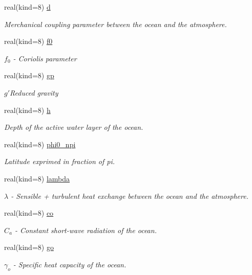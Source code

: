 \begin{DoxyCompactItemize}
real(kind=8) \hyperlink{classparams_a612e8c87d1d9514ebe7ab3ac95141be3}{d}
\begin{DoxyCompactList}\small\item\em Merchanical coupling parameter between the ocean and the atmosphere. \end{DoxyCompactList}\item 
real(kind=8) \hyperlink{classparams_a83c176b3a593aa6ac77c50d2b5b21032}{f0}
\begin{DoxyCompactList}\small\item\em $f_0$ -\/ Coriolis parameter \end{DoxyCompactList}\item 
real(kind=8) \hyperlink{classparams_a29ba9893360b5685ca584deead6dbc55}{gp}
\begin{DoxyCompactList}\small\item\em $g'$Reduced gravity \end{DoxyCompactList}\item 
real(kind=8) \hyperlink{classparams_a6d9c99d7dfc62518cf51eb98e7f39707}{h}
\begin{DoxyCompactList}\small\item\em Depth of the active water layer of the ocean. \end{DoxyCompactList}\item 
real(kind=8) \hyperlink{classparams_a516e6c305e938087cfe780629c76ef64}{phi0\-\_\-npi}
\begin{DoxyCompactList}\small\item\em Latitude exprimed in fraction of pi. \end{DoxyCompactList}\item 
real(kind=8) \hyperlink{classparams_a022da5c60234624dcc3d76382a7382da}{lambda}
\begin{DoxyCompactList}\small\item\em $\lambda$ -\/ Sensible + turbulent heat exchange between the ocean and the atmosphere. \end{DoxyCompactList}\item 
real(kind=8) \hyperlink{classparams_a36a35eafddb662c94c227a30cbf85fd4}{co}
\begin{DoxyCompactList}\small\item\em $C_a$ -\/ Constant short-\/wave radiation of the ocean. \end{DoxyCompactList}\item 
real(kind=8) \hyperlink{classparams_a30bd914fd64880f5407ebb055e72b88c}{go}
\begin{DoxyCompactList}\small\item\em $\gamma_o$ -\/ Specific heat capacity of the ocean. \end{DoxyCompactList}\item 

\end{DoxyCompactItemize}
